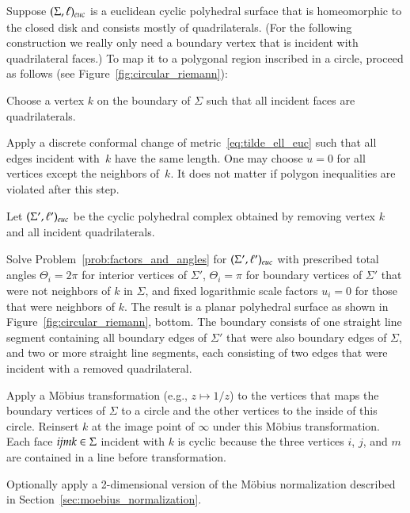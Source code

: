 \documentclass[Thesis]{subfiles}
\begin{document}
Suppose $(\Sigma,\ell)_{\euc}$ is a euclidean cyclic polyhedral
surface that is homeomorphic to the closed disk and consists mostly of
quadrilaterals. (For the following construction we really only need a
boundary vertex that is incident with quadrilateral faces.) To map it
to a polygonal region inscribed in a circle, proceed as follows (see
Figure~\ref{fig:circular_riemann}):


\begin{compactenum}[(1)]
\item Choose a vertex $k$ on the boundary of $\Sigma$ such that all
  incident faces are quadrilaterals.
\item Apply a discrete conformal change of
  metric~\eqref{eq:tilde_ell_euc} such that all edges incident
  with~$k$ have the same length. One may choose $u=0$ for all
  vertices except the neighbors of~$k$. It does not matter if polygon
  inequalities are violated after this step.
\item Let $(\Sigma',\ell')_{\euc}$ be the cyclic polyhedral complex obtained by 
  removing vertex $k$ and all incident quadrilaterals.
\item Solve Problem~\ref{prob:factors_and_angles} for
  $(\Sigma',\ell')_{\euc}$ with prescribed total angles
  $\Theta_i=2\pi$ for interior vertices of $\Sigma'$, $\Theta_i=\pi$
  for boundary vertices of $\Sigma'$ that were not neighbors of $k$ in
  $\Sigma$, and fixed logarithmic scale factors $u_i=0$ for those that
  were neighbors of $k$. The result is a planar polyhedral surface as
  shown in Figure~\ref{fig:circular_riemann}, bottom. The boundary
  consists of one straight line segment containing all boundary edges
  of $\Sigma'$ that were also boundary edges of $\Sigma$, and two or
  more straight line segments, each consisting of two edges that were
  incident with a removed quadrilateral.
\item Apply a M{\"o}bius transformation (e.g., $z\mapsto 1/z$) to the
  vertices that maps the boundary vertices of $\Sigma$ to a circle and
  the other vertices to the inside of this circle. Reinsert $k$ at the image
  point of $\infty$ under this M{\"o}bius transformation. Each face
  ${\it ijmk} \in \Sigma$ incident with $k$ is cyclic because the three
  vertices $i$, $j$, and $m$ are contained in a line before
  transformation.
\item Optionally apply a 2-dimensional version of the M{\"o}bius
  normalization described in Section~\ref{sec:moebius_normalization}.
\end{compactenum} 
\end{document}
